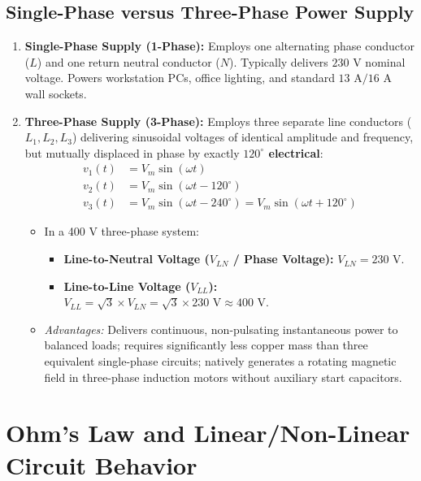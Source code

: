 \subsection{Single-Phase versus Three-Phase Power Supply}
\begin{enumerate}[label=\bfseries\arabic*.]
    \item \textbf{Single-Phase Supply (1-Phase):} Employs one alternating phase conductor ($L$) and one return neutral conductor ($N$). Typically delivers $230\text{ V}$ nominal voltage. Powers workstation PCs, office lighting, and standard $13\text{ A}/16\text{ A}$ wall sockets.
    \item \textbf{Three-Phase Supply (3-Phase):} Employs three separate line conductors ($L_1, L_2, L_3$) delivering sinusoidal voltages of identical amplitude and frequency, but mutually displaced in phase by exactly \textbf{$120^{\circ}$ electrical}:
    \begin{align*}
    v_1(t) &= V_m \sin(\omega t) \\
    v_2(t) &= V_m \sin(\omega t - 120^{\circ}) \\
    v_3(t) &= V_m \sin(\omega t - 240^{\circ}) = V_m \sin(\omega t + 120^{\circ})
    \end{align*}
    \begin{itemize}
        \item In a 400 V three-phase system:
        \begin{itemize}
            \item \textbf{Line-to-Neutral Voltage ($V_{LN}$ / Phase Voltage):} $V_{LN} = 230\text{ V}$.
            \item \textbf{Line-to-Line Voltage ($V_{LL}$):} $V_{LL} = \sqrt{3} \times V_{LN} = \sqrt{3} \times 230\text{ V} \approx 400\text{ V}$.
        \end{itemize}
        \item \textit{Advantages:} Delivers continuous, non-pulsating instantaneous power to balanced loads; requires significantly less copper mass than three equivalent single-phase circuits; natively generates a rotating magnetic field in three-phase induction motors without auxiliary start capacitors.
    \end{itemize}
\end{enumerate}


\section{Ohm's Law and Linear/Non-Linear Circuit Behavior}
\label{sec:ohms_law}

